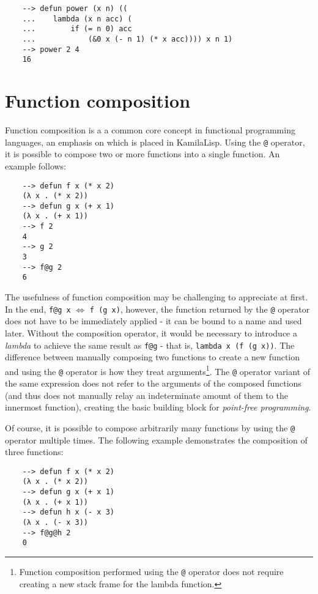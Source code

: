 \begin{Verbatim}
    --> defun power (x n) ((
    ...    lambda (x n acc) (
    ...        if (= n 0) acc
    ...            (&0 x (- n 1) (* x acc)))) x n 1)
    --> power 2 4
    16
\end{Verbatim}

\section{Function composition}

Function composition is a a common core concept in functional programming languages, an emphasis on which is placed in KamilaLisp. Using the \verb|@| operator, it is possible to compose two or more functions into a single function. An example follows:

\begin{Verbatim}
    --> defun f x (* x 2)
    (λ x . (* x 2))
    --> defun g x (+ x 1)
    (λ x . (+ x 1))
    --> f 2
    4
    --> g 2
    3
    --> f@g 2
    6
\end{Verbatim}

The usefulness of function composition may be challenging to appreciate at first. In the end, \verb|f@g x| $\Leftrightarrow$ \verb|f (g x)|, however, the function returned by the \verb|@| operator does not have to be immediately applied - it can be bound to a name and used later. Without the composition operator, it would be necessary to introduce a \textit{lambda} to achieve the same result as \verb|f@g| - that is, \verb|lambda x (f (g x))|. The difference between manually composing two functions to create a new function and using the \verb|@| operator is how they treat arguments\footnote{Function composition performed using the \verb|@| operator does not require creating a new stack frame for the lambda function.}. The \verb|@| operator variant of the same expression does not refer to the arguments of the composed functions (and thus does not manually relay an indeterminate amount of them to the innermost function), creating the basic building block for \textit{point-free programming}.

Of course, it is possible to compose arbitrarily many functions by using the \verb|@| operator multiple times. The following example demonstrates the composition of three functions:

\begin{Verbatim}
    --> defun f x (* x 2)
    (λ x . (* x 2))
    --> defun g x (+ x 1)
    (λ x . (+ x 1))
    --> defun h x (- x 3)
    (λ x . (- x 3))
    --> f@g@h 2
    0
\end{Verbatim}

